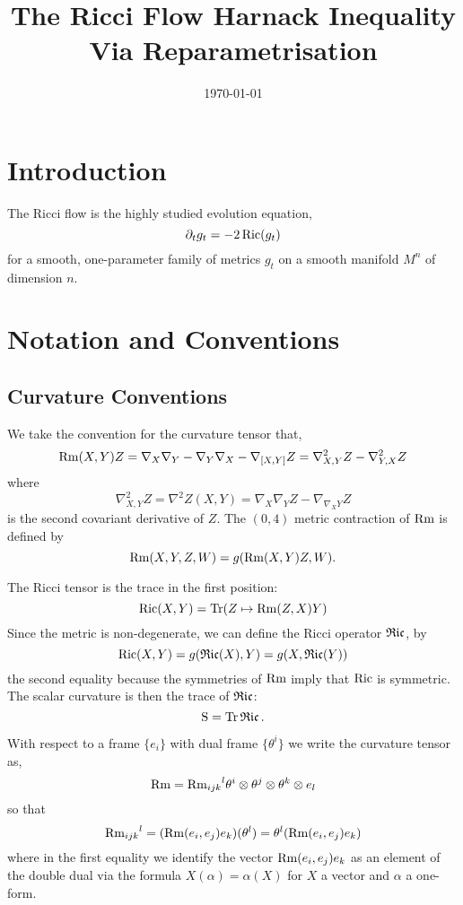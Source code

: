\documentclass{amsart}
\begin{document}
\title[Harnack For Ricci Flow]
 {The Ricci Flow Harnack Inequality Via Reparametrisation}

\curraddr{}
\email{}
\date{\today}

\dedicatory{}
\subjclass[2010]{}
\keywords{}

\begin{abstract}
\end{abstract}

\maketitle

\section{Introduction}
\label{sec:intro}

The Ricci flow is the highly studied evolution equation,
\[
\partial_t g_t = - 2\operatorname{Ric} (g_t)
\]
for a smooth, one-parameter family of metrics \(g_t\) on a smooth manifold \(M^n\) of dimension \(n\).

\section{Notation and Conventions}
\label{sec:conventions}

\subsection{Curvature Conventions}
\label{subsec:conventions_curvature}

We take the convention for the curvature tensor that,
\[
\operatorname{Rm}(X, Y) Z = \nabla_X \nabla_Y - \nabla_ Y \nabla_X - \nabla_{[X, Y]} Z = \nabla^2_{X, Y} Z - \nabla^2_{Y, X} Z
\]
where
\[
\nabla^2_{X, Y} Z = \nabla^2 Z (X, Y) = \nabla_X \nabla_Y Z - \nabla_{\nabla_X Y} Z
\]
is the second covariant derivative of \(Z\). The \((0, 4)\) metric contraction of \(\operatorname{Rm}\) is defined by
\[
\operatorname{Rm}(X, Y, Z, W) = g(\operatorname{Rm}(X, Y)Z, W).
\]

The Ricci tensor is the trace in the first position:
\[
\operatorname{Ric}(X, Y) = \operatorname{Tr} (Z \mapsto \operatorname{Rm}(Z, X)Y)
\]
Since the metric is non-degenerate, we can define the Ricci operator \(\operatorname{\mathfrak{Ric}}\), by
\[
\operatorname{Ric}(X, Y) = g(\operatorname{\mathfrak{Ric}}(X), Y) = g(X, \operatorname{\mathfrak{Ric}}(Y))
\]
the second equality because the symmetries of \(\operatorname{Rm}\) imply that \(\operatorname{Ric}\) is symmetric. The scalar curvature is then the trace of \(\operatorname{\mathfrak{Ric}}\):
\[
\operatorname{S} = \operatorname{Tr} \operatorname{\mathfrak{Ric}}.
\]

With respect to a frame \(\{e_i\}\) with dual frame \(\{\theta^i\}\) we write the curvature tensor as,
\[
\operatorname{Rm} = {\operatorname{Rm}_{ijk}}^l \theta^i \otimes \theta^j \otimes \theta^k \otimes e_l
\]
so that
\[
{\operatorname{Rm}_{ijk}}^l = (\operatorname{Rm}(e_i, e_j) e_k) (\theta^l) = \theta^l (\operatorname{Rm}(e_i, e_j) e_k)
\]
where in the first equality we identify the vector \(\operatorname{Rm}(e_i, e_j)e_k\) as an element of the double dual via the formula \(X(\alpha) = \alpha(X)\) for \(X\) a vector and \(\alpha\) a one-form.
\end{document}

